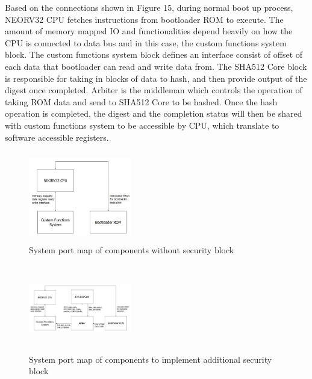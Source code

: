 \documentclass[a4paper,fleqn]{cas-dc}
\begin{document}
Based on the connections shown in Figure 15, during normal boot up process, NEORV32 CPU fetches instructions from bootloader ROM to execute. The amount of memory mapped IO and functionalities depend heavily on how the CPU is connected to data bus and in this case, the custom functions system block. The custom functions system block defines an interface consist of offset of each data that bootloader can read and write data from. The SHA512 Core block is responsible for taking in blocks of data to hash, and then provide output of the digest once completed. Arbiter is the middleman which controls the operation of taking ROM data and send to SHA512 Core to be hashed. Once the hash operation is completed, the digest and the completion status will then be shared with custom functions system to be accessible by CPU, which translate to software accessible registers.

\begin{figure}[hbt!]
	\centering
	\includegraphics[width=0.4\textwidth,height=1.55in]{figs/SystemPortMap-Original.JPG}
	\caption{System port map of components without security block}
\end{figure}

\begin{figure}[hbt!]
	\centering
	\includegraphics[width=0.4\textwidth,height=1.5in]{figs/SystemPortMap-Amended.JPG}
	\caption{System port map of components to implement additional security block}
\end{figure}
\end{document}
